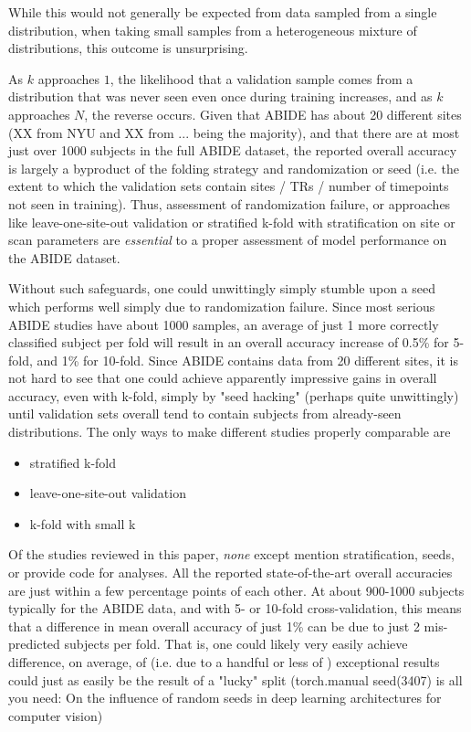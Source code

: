 \documentclass[10pt]{article}
\begin{document}
While this would not generally be expected from data sampled from a single
distribution, when taking small samples from a heterogeneous mixture of distributions, this outcome
is unsurprising.

As \(k\) approaches \(1\), the likelihood that a validation sample comes from a distribution that
was never seen even once during training increases, and as \(k\) approaches \(N\), the reverse
occurs. Given that ABIDE has about 20 different sites (XX from NYU and XX from ... being the
majority), and that there are at most just over 1000 subjects in the full ABIDE dataset, the
reported overall accuracy is largely a byproduct of the folding strategy and randomization or seed
(i.e. the extent to which the validation sets contain sites / TRs / number of timepoints not seen in
training). Thus, assessment of randomization failure, or approaches like leave-one-site-out
validation or stratified k-fold with stratification on site or scan parameters are \emph{essential}
to a proper assessment of model performance on the ABIDE dataset.

Without such safeguards, one could unwittingly simply stumble upon a seed which performs well simply
due to randomization failure. Since most serious ABIDE studies have about 1000 samples, an average
of just 1 more correctly classified subject per fold will result in an overall accuracy increase of
0.5\% for 5-fold, and 1\% for 10-fold. Since ABIDE contains data from 20 different sites, it is not
hard to see that one could achieve apparently impressive gains in overall accuracy, even with
k-fold, simply by "seed hacking" (perhaps quite unwittingly) until validation sets overall tend to
contain subjects from already-seen distributions. The only ways to make different studies properly comparable are

\begin{itemize}
  \item stratified k-fold
  \item leave-one-site-out validation \citep{ingalhalikarFunctionalConnectivitybasedPrediction2021}
  \item k-fold with small k
\end{itemize}

Of the studies reviewed in this paper, \emph{none} except
\citet{ingalhalikarFunctionalConnectivitybasedPrediction2021} mention stratification, seeds, or
provide code for analyses. All the reported state-of-the-art overall accuracies are just within a
few percentage points of each other. At about 900-1000 subjects typically for the ABIDE data, and
with 5- or 10-fold cross-validation, this means that a difference in mean overall accuracy of just
1\% can be due to just 2 mis-predicted subjects per fold. That is, one could likely very easily
achieve  difference, on average, of   (i.e. due to a handful or less of ) exceptional results could
just as easily be the result of a "lucky" split (torch.manual seed(3407) is all you need: On the
influence of random seeds in deep learning architectures for computer vision)
\end{document}
